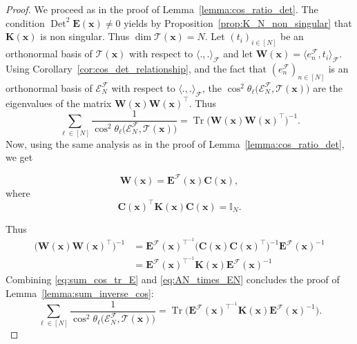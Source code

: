 \documentclass[twoside,11pt]{book}
\DeclareMathOperator{\Tr}{Tr}
\DeclareMathOperator{\Det}{Det}
\DeclareMathOperator{\Tran}{\intercal}
\begin{document}
\begin{proof}
We proceed as in the proof of Lemma~\ref{lemma:cos_ratio_det}. 
The condition $\Det^{2} \bm{E}(\bm{x}) \neq 0$ yields by Proposition~\ref{prop:K_N_non_singular} that $\bm{K}(\bm{x})$ is non singular. Thus $\dim \mathcal{T}(\bm{x}) = N$. Let $(t_{i})_{i \in [N]}$ be an orthonormal basis of $\mathcal{T}(\bm{x})$ with respect to $\langle ., . \rangle_{\mathcal{F}}$ and let $\bm{W}(\bm{x}) = \langle e_{n}^{\mathcal{F}}, t_{i} \rangle_{\mathcal{F}}$.
%
Using Corollary~\ref{cor:cos_det_relationship}, and the fact that $(e_{n}^{\mathcal{F}})_{n \in [N]}$ is an orthonormal basis of $\mathcal{E}^{\mathcal{F}}_{N}$ with respect to $\langle ., . \rangle_{\mathcal{F}}$, the $\cos^{2} \theta_{\ell} \bigg(\mathcal{E}^{\mathcal{F}}_{N}, \mathcal{T}(\bm{x}) \bigg)$ are the eigenvalues of the matrix $\bm{W}(\bm{x})\bm{W}(\bm{x})^{\Tran}$. Thus
\begin{equation}\label{eq:sum_cos_tr_E}
\sum\limits_{\ell \in [N]} \frac{1}{\cos^{2} \theta_{\ell} \bigg(\mathcal{E}^{\mathcal{F}}_{N}, \mathcal{T}(\bm{x}) \bigg)} = \Tr \bigg( \bm{W}(\bm{x})\bm{W}(\bm{x})^{\Tran} \bigg)^{-1}.
\end{equation}
Now, using the same analysis as in the proof of Lemma~\ref{lemma:cos_ratio_det}, we get 


\begin{equation}
\bm{W}(\bm{x}) = \bm{E}^{\mathcal{F}}(\bm{x})\bm{C}(\bm{x}) ,
\end{equation}
where
\begin{equation}
\bm{C}(\bm{x})^{\Tran} \bm{K}(\bm{x}) \bm{C}(\bm{x}) = \mathbb{I}_{N}.
\end{equation}

%
Thus
\begin{align}\label{eq:AN_times_EN}
\bigg( \bm{W}(\bm{x})\bm{W}(\bm{x})^{\Tran} \bigg)^{-1} & = \bm{E}^{\mathcal{F}}(\bm{x})^{\Tran^{-1}} \bigg( \bm{C}(\bm{x})\bm{C}(\bm{x})^{\Tran} \bigg)^{-1}  \bm{E}^{\mathcal{F}}(\bm{x})^{-1} \nonumber \\
& = \bm{E}^{\mathcal{F}}(\bm{x})^{\Tran^{-1}} \bm{K}(\bm{x}) \bm{E}^{\mathcal{F}}(\bm{x})^{-1}
\end{align}
Combining \eqref{eq:sum_cos_tr_E} and \eqref{eq:AN_times_EN} concludes the proof of Lemma~\ref{lemma:sum_inverse_cos}:
\begin{equation}
\sum\limits_{\ell \in [N]} \frac{1}{\cos^{2} \theta_{\ell} \bigg(\mathcal{E}^{\mathcal{F}}_{N}, \mathcal{T}(\bm{x}) \bigg)} = \Tr \bigg(\bm{E}^{\mathcal{F}}(\bm{x})^{\Tran^{-1}} \bm{K}(\bm{x})  \bm{E}^{\mathcal{F}}(\bm{x})^{-1} \bigg).
\end{equation}
\end{proof}
\end{document}
